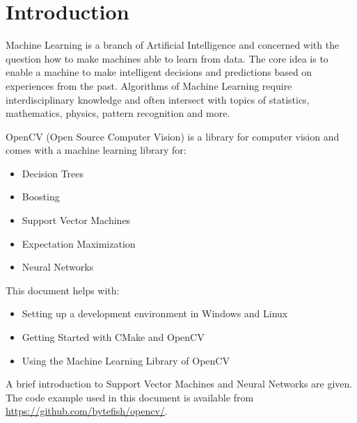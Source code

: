 \section{Introduction}
Machine Learning is a branch of Artificial Intelligence and concerned with the question how to make machines able to learn from data. The core idea is to enable a machine to make intelligent decisions and predictions based on experiences from the past. Algorithms of Machine Learning require interdisciplinary knowledge and often intersect with topics of statistics, mathematics, physics, pattern recognition and more.

OpenCV (Open Source Computer Vision) is a library for computer vision and comes with a machine learning library for:
\begin{itemize}
 \item Decision Trees
 \item Boosting
 \item Support Vector Machines
 \item Expectation Maximization
 \item Neural Networks
\end{itemize}

This document helps with:
\begin{itemize}
 \item Setting up a development environment in Windows and Linux
 \item Getting Started with CMake and OpenCV
 \item Using the Machine Learning Library of OpenCV
\end{itemize}
A brief introduction to Support Vector Machines and Neural Networks are given. The code example used in this document is available from \url{https://github.com/bytefish/opencv/}.